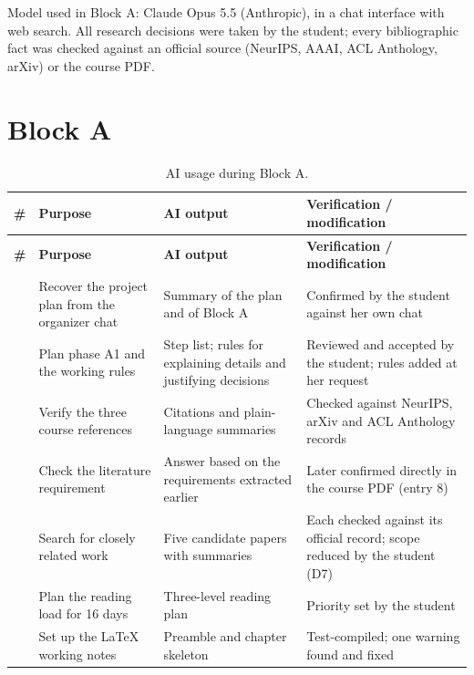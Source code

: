 \documentclass[11pt,a4paper]{report}
\begin{document}
\begin{notebox}
Model used in Block A: Claude Opus 5.5 (Anthropic), in a chat interface with
web search. All research decisions were taken by the student; every
bibliographic fact was checked against an official source (NeurIPS, AAAI,
ACL Anthology, arXiv) or the course PDF.
\end{notebox}

\section{Block A}\label{sec:ailog-a}

{\small
\renewcommand{\arraystretch}{1.25}
\begin{longtable}{
  >{\raggedright\arraybackslash}p{0.6cm}
  >{\raggedright\arraybackslash}p{4.4cm}
  >{\raggedright\arraybackslash}p{4.4cm}
  >{\raggedright\arraybackslash}p{4.8cm}}
\caption{AI usage during Block A.}\label{tab:ailog-a}\\
\toprule
\textbf{\#} & \textbf{Purpose} & \textbf{AI output} & \textbf{Verification / modification} \\
\midrule
\endfirsthead
\toprule
\textbf{\#} & \textbf{Purpose} & \textbf{AI output} & \textbf{Verification / modification} \\
\midrule
\endhead
\bottomrule
\endfoot
1 & Recover the project plan from the organizer chat
  & Summary of the plan and of Block A
  & Confirmed by the student against her own chat \\
2 & Plan phase A1 and the working rules
  & Step list; rules for explaining details and justifying decisions
  & Reviewed and accepted by the student; rules added at her request \\
3 & Verify the three course references
  & Citations and plain-language summaries
  & Checked against NeurIPS, arXiv and ACL Anthology records \\
4 & Check the literature requirement
  & Answer based on the requirements extracted earlier
  & Later confirmed directly in the course PDF (entry 8) \\
5 & Search for closely related work
  & Five candidate papers with summaries
  & Each checked against its official record; scope reduced by the student (D7) \\
6 & Plan the reading load for 16 days
  & Three-level reading plan
  & Priority set by the student \\
7 & Set up the LaTeX working notes
  & Preamble and chapter skeleton
  & Test-compiled; one warning found and fixed \\

\end{longtable}}
\end{document}
